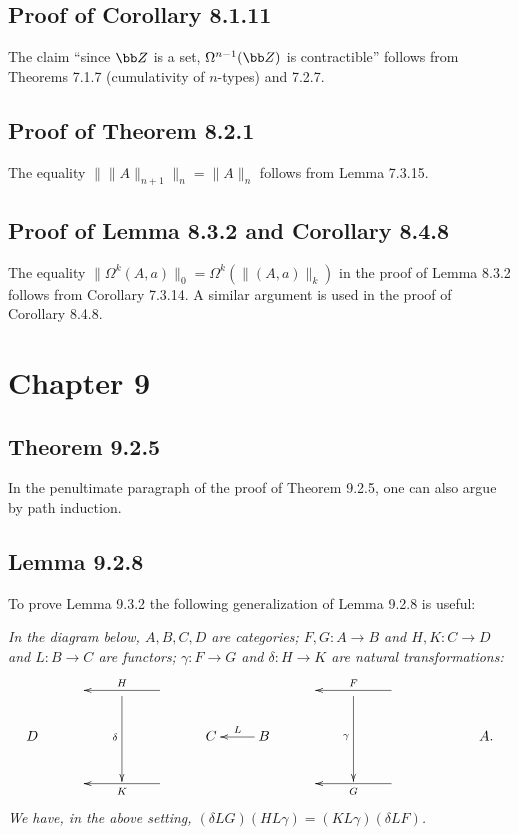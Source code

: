 \documentclass[12pt]{article}
\begin{document}
\subsection{Proof of Corollary 8.1.11}

The claim ``since $\bb Z$ is a set, $\Omega^{n-1}(\bb Z)$ is contractible'' follows from Theorems 7.1.7 (cumulativity of $n$-types) and 7.2.7.


\subsection{Proof of Theorem 8.2.1}

The equality $\lVert\lVert A\rVert_{n+1}\rVert_n=\lVert A\rVert_n$ follows from Lemma 7.3.15.


\subsection{Proof of Lemma 8.3.2 and Corollary 8.4.8}

The equality $\lVert\Omega^k(A,a)\rVert_0=\Omega^k(\lVert(A,a)\rVert_k)$ in the proof of Lemma 8.3.2 follows from Corollary 7.3.14. A similar argument is used in the proof of Corollary 8.4.8.


\section{Chapter 9}

\subsection{Theorem 9.2.5}

In the penultimate paragraph of the proof of Theorem 9.2.5, one can also argue by path induction.


\subsection{Lemma 9.2.8}\label{928}

To prove Lemma 9.3.2 the following generalization of Lemma 9.2.8 is useful:

\nn\emph{In the diagram below, $A,B,C,D$ are categories; $F,G:A\to B$ and $H,K:C\to D$ and $L:B\to C$ are functors; $\gamma:F\to G$ and $\delta:H\to K$ are natural transformations:
$$
\xymatrix{
&&\ar[dd]_\delta&\ar[ll]_H&&&&\ar[dd]_\gamma&\ar[ll]_F\\
D&&&&C&B\ar[l]_L&&&&&A.\\
&&&\ar[ll]^K&&&&&\ar[ll]^G}
$$ 
We have, in the above setting, $(\delta LG)(HL\gamma)=(KL\gamma)(\delta LF)$.}
\end{document}
